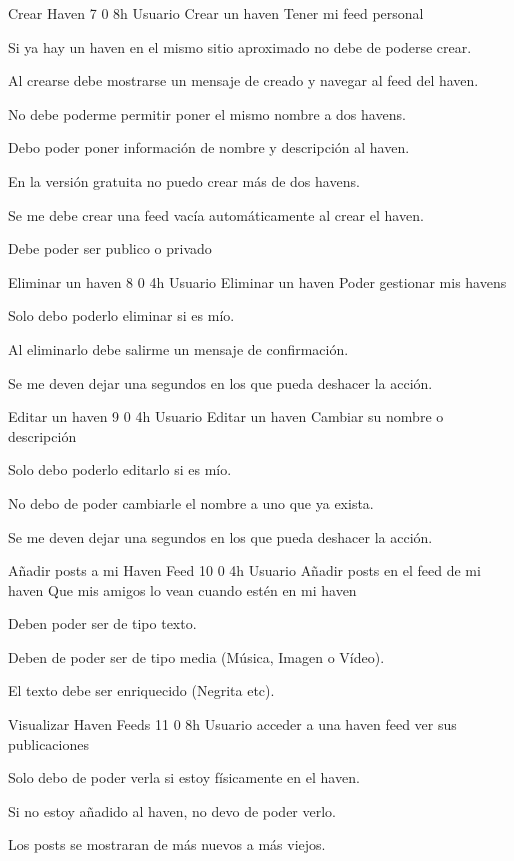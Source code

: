\UserStory
{Crear Haven}
{7}
{0}
{8h}
{Usuario}
{Crear un haven}
{Tener mi feed personal}
{
\item Si ya hay un haven en el mismo sitio aproximado no debe de poderse crear.
\item Al crearse debe mostrarse un mensaje de creado y navegar al feed del haven.
\item No debe poderme permitir poner el mismo nombre a dos havens.
\item Debo poder poner información de nombre y descripción al haven.
\item En la versión gratuita no puedo crear más de dos havens.
\item Se me debe crear una feed vacía automáticamente al crear el haven.
\item Debe poder ser publico o privado
}

\UserStory
{Eliminar un haven}
{8}
{0}
{4h}
{Usuario}
{Eliminar un haven}
{Poder gestionar mis havens}
{
\item Solo debo poderlo eliminar si es mío.
\item Al eliminarlo debe salirme un mensaje de confirmación.
\item Se me deven dejar una segundos en los que pueda deshacer la acción.
}

\UserStory
{Editar un haven}
{9}
{0}
{4h}
{Usuario}
{Editar un haven}
{Cambiar su nombre o descripción}
{
\item Solo debo poderlo editarlo si es mío.
\item No debo de poder cambiarle el nombre a uno que ya exista.
\item Se me deven dejar una segundos en los que pueda deshacer la acción.
}

\UserStory
{Añadir posts a mi Haven Feed}
{10}
{0}
{4h}
{Usuario}
{Añadir posts en el feed de mi haven}
{Que mis amigos lo vean cuando estén en mi haven}
{
\item Deben poder ser de tipo texto.
\item Deben de poder ser de tipo media (Música, Imagen o Vídeo).
\item El texto debe ser enriquecido (Negrita etc).
}

\UserStory
{Visualizar Haven Feeds}
{11}
{0}
{8h}
{Usuario}
{acceder a una haven feed}
{ver sus publicaciones}
{
\item Solo debo de poder verla si estoy físicamente en el haven.
\item Si no estoy añadido al haven, no devo de poder verlo.
\item Los posts se mostraran de más nuevos a más viejos.
}

